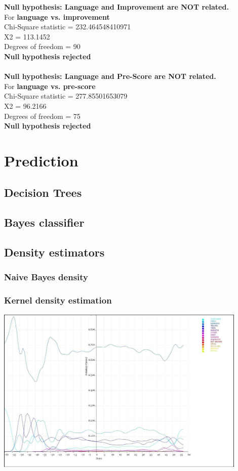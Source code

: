 \documentclass[10pt]{article}
\begin{document}
\textbf{Null hypothesis: Language and Improvement are NOT related.}\\
 For \textbf{language vs. improvement}\\
 Chi-Square statistic = 232.464548410971\\
 X2 = 113.1452\\
 Degrees of freedom = 90\\
 \textbf{Null hypothesis rejected}\\
\\
\textbf{Null hypothesis: Language and Pre-Score are NOT related.}\\
 For \textbf{language vs. pre-score}\\
 Chi-Square statistic = 277.85501653079\\
 X2 = 96.2166\\
 Degrees of freedom = 75\\
 \textbf{Null hypothesis rejected}\\

\newpage
\section{Prediction}
\subsection{Decision Trees}
\subsection{Bayes classifier}
\subsection{Density estimators}
\subsubsection{Naive Bayes density}
\subsubsection{Kernel density estimation}
\includegraphics[width=120mm]{ReportMedia/BayesLanguageFromImprovement.jpg}
\end{document}
